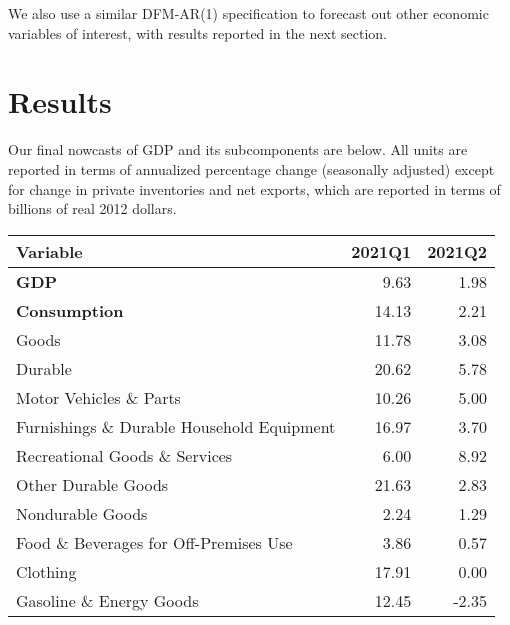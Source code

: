 \documentclass[11pt, letterpaper]{article}\usepackage[]{graphicx}\usepackage[]{color}
\begin{document}
We also use a similar DFM-AR(1) specification to forecast out other economic variables of interest, with results reported in the next section.


\section{Results}
Our final nowcasts of GDP and its subcomponents are below. All units are reported in terms of annualized percentage change (seasonally adjusted) except for change in private inventories and net exports, which are reported in terms of billions of real 2012 dollars.
\begin{table}[H]
\centering
\begingroup\fontsize{10pt}{12pt}\selectfont
\begin{tabular}{lrr}
  \hline
Variable & 2021Q1 & 2021Q2 \\ 
  \hline
\hspace{0mm} \textbf{GDP} & 9.63 & 1.98 \\ 
  \hspace{0mm} \textbf{Consumption} & 14.13 & 2.21 \\ 
  \hspace{8mm}  Goods & 11.78 & 3.08 \\ 
  \hspace{16mm}  Durable & 20.62 & 5.78 \\ 
  \hspace{24mm}  Motor Vehicles \& Parts & 10.26 & 5.00 \\ 
  \hspace{24mm}  Furnishings \& Durable Household Equipment & 16.97 & 3.70 \\ 
  \hspace{24mm}  Recreational Goods \& Services & 6.00 & 8.92 \\ 
  \hspace{24mm}  Other Durable Goods & 21.63 & 2.83 \\ 
  \hspace{16mm}  Nondurable Goods & 2.24 & 1.29 \\ 
  \hspace{24mm}  Food \& Beverages for Off-Premises Use & 3.86 & 0.57 \\ 
  \hspace{24mm}  Clothing & 17.91 & 0.00 \\ 
  \hspace{24mm}  Gasoline \& Energy Goods & 12.45 & -2.35 \\ 

\end{tabular}
\end{table}
\end{document}
